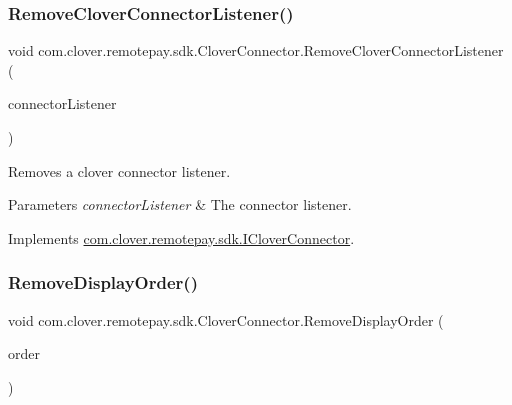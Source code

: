 \subsubsection{\texorpdfstring{Remove\+Clover\+Connector\+Listener()}{RemoveCloverConnectorListener()}}
{\footnotesize\ttfamily void com.\+clover.\+remotepay.\+sdk.\+Clover\+Connector.\+Remove\+Clover\+Connector\+Listener (\begin{DoxyParamCaption}\item[{\hyperlink{interfacecom_1_1clover_1_1remotepay_1_1sdk_1_1_i_clover_connector_listener}{I\+Clover\+Connector\+Listener}}]{connector\+Listener }\end{DoxyParamCaption})}



Removes a clover connector listener. 


\begin{DoxyParams}{Parameters}
{\em connector\+Listener} & The connector listener.\\
\hline
\end{DoxyParams}


Implements \hyperlink{interfacecom_1_1clover_1_1remotepay_1_1sdk_1_1_i_clover_connector_a4acba7cae456cb73a0acf4331cae04f9}{com.\+clover.\+remotepay.\+sdk.\+I\+Clover\+Connector}.

\mbox{\label{classcom_1_1clover_1_1remotepay_1_1sdk_1_1_clover_connector_af5a1b2bddf01b44eaa40af3f8212451b}} 
\subsubsection{\texorpdfstring{Remove\+Display\+Order()}{RemoveDisplayOrder()}}
{\footnotesize\ttfamily void com.\+clover.\+remotepay.\+sdk.\+Clover\+Connector.\+Remove\+Display\+Order (\begin{DoxyParamCaption}\item[{\hyperlink{classcom_1_1clover_1_1remote_1_1order_1_1_display_order}{Display\+Order}}]{order }\end{DoxyParamCaption})}



